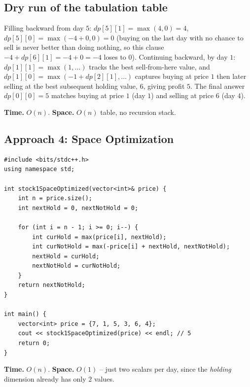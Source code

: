 \subsection*{Dry run of the tabulation table}


Filling backward from day $5$: $\textit{dp}[5][1]=\max(4,0)=4$,
$\textit{dp}[5][0]=\max(-4+0,0)=0$ (buying on the last day with no
chance to sell is never better than doing nothing, so this clause
$-4+\textit{dp}[6][1]=-4+0=-4$ loses to $0$). Continuing backward, by
day $1$: $\textit{dp}[1][1]=\max(1,\ldots)$ tracks the best sell-from-here
value, and $\textit{dp}[1][0]=\max(-1+\textit{dp}[2][1], \ldots)$
captures buying at price $1$ then later selling at the best subsequent
holding value, $6$, giving profit $5$. The final answer
$\textit{dp}[0][0]=5$ matches buying at price $1$ (day $1$) and selling
at price $6$ (day $4$).

\begin{complexitybox}
\textbf{Time.} $O(n)$.
\textbf{Space.} $O(n)$ table, no recursion stack.
\end{complexitybox}

\subsection*{Approach 4: Space Optimization}

\begin{lstlisting}
#include <bits/stdc++.h>
using namespace std;

int stock1SpaceOptimized(vector<int>& price) {
    int n = price.size();
    int nextHold = 0, nextNotHold = 0;

    for (int i = n - 1; i >= 0; i--) {
        int curHold = max(price[i], nextHold);
        int curNotHold = max(-price[i] + nextHold, nextNotHold);
        nextHold = curHold;
        nextNotHold = curNotHold;
    }
    return nextNotHold;
}

int main() {
    vector<int> price = {7, 1, 5, 3, 6, 4};
    cout << stock1SpaceOptimized(price) << endl; // 5
    return 0;
}
\end{lstlisting}

\begin{complexitybox}
\textbf{Time.} $O(n)$.
\textbf{Space.} $O(1)$ -- just two scalars per day, since the
\textit{holding} dimension already has only $2$ values.
\end{complexitybox}

